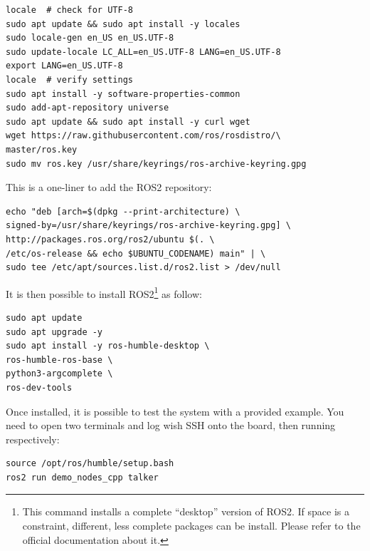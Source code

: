 \documentclass[10pt]{article}
\begin{document}
\begin{tcolorbox}
\begin{verbatim}
locale  # check for UTF-8
sudo apt update && sudo apt install -y locales
sudo locale-gen en_US en_US.UTF-8
sudo update-locale LC_ALL=en_US.UTF-8 LANG=en_US.UTF-8
export LANG=en_US.UTF-8
locale  # verify settings
sudo apt install -y software-properties-common
sudo add-apt-repository universe
sudo apt update && sudo apt install -y curl wget
wget https://raw.githubusercontent.com/ros/rosdistro/\
master/ros.key
sudo mv ros.key /usr/share/keyrings/ros-archive-keyring.gpg
\end{verbatim}
\end{tcolorbox}


This is a one-liner to add the ROS2 repository:

\begin{tcolorbox}
\begin{verbatim}
echo "deb [arch=$(dpkg --print-architecture) \
signed-by=/usr/share/keyrings/ros-archive-keyring.gpg] \
http://packages.ros.org/ros2/ubuntu $(. \
/etc/os-release && echo $UBUNTU_CODENAME) main" | \
sudo tee /etc/apt/sources.list.d/ros2.list > /dev/null
\end{verbatim}
\end{tcolorbox}

It is then possible to install ROS2\footnote{This command installs a complete ``desktop'' version of ROS2. If space is a constraint, different, less complete packages can be install. Please refer to the official documentation about it.} as follow:

\begin{tcolorbox}
\begin{verbatim}
sudo apt update
sudo apt upgrade -y
sudo apt install -y ros-humble-desktop \
ros-humble-ros-base \
python3-argcomplete \
ros-dev-tools
\end{verbatim}
\end{tcolorbox}

Once installed, it is possible to test the system with a provided example.
You need to open two terminals and log wish SSH onto the board, then running
respectively:

\begin{tcolorbox}
\begin{verbatim}
source /opt/ros/humble/setup.bash
ros2 run demo_nodes_cpp talker
\end{verbatim}
\end{tcolorbox}
\end{document}
